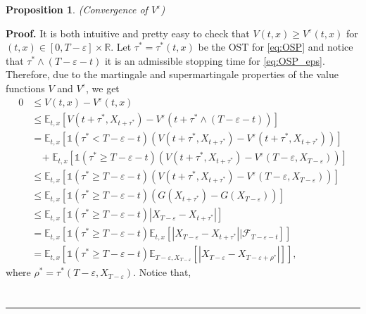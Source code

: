 \documentclass{tufte-handout}
\newcommand{\E}{\mathbb{E}} %
\newcommand{\R}{\mathbb{R}} %
\newtheorem{pr}{Proposition}
\newenvironment{pf}[1][Proof]{\textbf{#1.} }{\ \rule{0.5em}{0.5em}}
\begin{document}
	\begin{pr}(Convergence of $V^\varepsilon$) \\
		
	\end{pr}
	
	\begin{pf}
		It is both intuitive and pretty easy to check that $V(t, x) \geq V^\varepsilon(t, x)$ for $(t, x) \in [0, T - \varepsilon]\times\R$. Let $\tau^* = \tau^*(t, x)$ be the OST for \eqref{eq:OSP} and notice that $\tau^*\wedge(T - \varepsilon - t)$ it is an admissible stopping time for \eqref{eq:OSP_eps}. Therefore, due to the martingale and supermartingale properties of the value functions $V$ and $V^{\varepsilon}$, we get
		\begin{align*}
		0 &\leq V(t, x) - V^\varepsilon(t, x) \\
		&\leq \E_{t, x}\left[V(t + \tau^*, X_{t + \tau^*}) - V^\varepsilon(t + \tau^*\wedge(T - \varepsilon - t))\right] \\
		&= \E_{t, x}\left[\mathbb{1}(\tau^* < T - \varepsilon - t)\left(V(t + \tau^*, X_{t + \tau^*}) - V^\varepsilon(t + \tau^*, X_{t + \tau^*})\right)\right] \\
		&\ \ \ \ + \E_{t, x}\left[\mathbb{1}(\tau^* \geq T - \varepsilon - t)\left(V(t + \tau^*, X_{t + \tau^*}) - V^\varepsilon(T - \varepsilon, X_{T - \varepsilon})\right)\right] \\
		&\leq \E_{t, x}\left[\mathbb{1}(\tau^* \geq T - \varepsilon - t)\left(V(t + \tau^*, X_{t + \tau^*}) - V^\varepsilon(T - \varepsilon, X_{T - \varepsilon})\right)\right] \\ 
		&\leq \E_{t, x}\left[\mathbb{1}(\tau^* \geq T - \varepsilon - t)\left(G(X_{t + \tau^*}) - G(X_{T - \varepsilon})\right)\right] \\
		&\leq \E_{t, x}\left[\mathbb{1}(\tau^* \geq T - \varepsilon - t)\left|X_{T - \varepsilon} - X_{t + \tau^*}\right|\right] \\
		&= \E_{t, x}\left[\mathbb{1}(\tau^* \geq T - \varepsilon - t)\E_{t, x}\left[\left|X_{T - \varepsilon} - X_{t + \tau^*}\right|\Big|\mathcal{F}_{T - \varepsilon - t}\right]\right] \\
		&= \E_{t, x}\left[\mathbb{1}(\tau^* \geq T - \varepsilon - t)\E_{T - \varepsilon, X_{T - \varepsilon}}\left[\left|X_{T - \varepsilon} - X_{T - \varepsilon + \rho^*}\right|\right]\right],
		\end{align*}
		where $\rho^* = \tau^*(T - \varepsilon, X_{T - \varepsilon})$. Notice that,
		\begin{align*}

\end{align*}
\end{pf}
\end{document}
